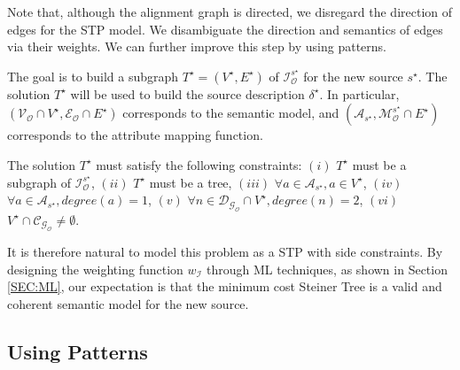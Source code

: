 \documentclass[letterpaper]{article} %
\newcommand{\authornote}[3]{
  {\fbox{\sc 
  #1}:$\blacktriangleright$\textcolor{#2}{\small{#3}}$\blacktriangleleft$}%
}
\newcommand{\npr}[1]{\authornote{NPR}{orange}{#1}}
\begin{document}
Note that, although the alignment graph is directed, we disregard the
direction of edges for the STP model.
We disambiguate the direction and semantics of edges via their
weights.
We can further improve this step by using patterns.

The goal is to build a subgraph $T^\star= (V^\star, E^\star)$ of
$\mathcal{I}_\mathcal{O}^{s^\star}$ for the new source $s^\star$. The solution 
$T^\star$ will 
be used to build the source description $\delta^\star$. 
In particular, $(\mathcal{V_O} \cap V^\star,\mathcal{E_O} \cap E^\star)$ 
corresponds to the semantic model, and 
$(\mathcal{A}_{s^\star},\mathcal{M}_\mathcal{O}^{s^\star} \cap E^\star)$ 
corresponds to 
the attribute mapping function.

The solution $T^\star$ must satisfy the following constraints:
	$(i)$ %
	$T^\star$ must be a subgraph of $\mathcal{I}_\mathcal{O}^{s^\star}$,
	$(ii)$ %
	$T^\star$ must be a tree,
	$(iii)$ %
	$\forall a \in \mathcal{A}_{s^\star}, a\in V^\star$,
	$(iv)$ %
	$\forall a \in \mathcal{A}_{s^\star}, degree(a) = 1$,
	$(v)$ %
	$\forall n \in \mathcal{D_{G_O}} \cap V^\star, degree(n) = 2$,
	$(vi)$ 
	$V^\star \cap \mathcal{C_{G_O}} \neq \emptyset$.

It is therefore natural to model this problem as a STP with side constraints.
By designing the weighting function $w_\mathcal{I}$ through 
ML techniques, as shown in Section \ref{SEC:ML}, 
our expectation is that the minimum cost Steiner Tree is a valid and coherent semantic model for the new source.


\subsection{Using Patterns}
\end{document}

